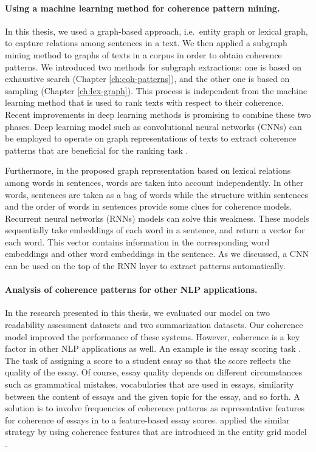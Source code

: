 \paragraph{Using a machine learning method for coherence pattern mining.} 
In this thesis, we used a graph-based approach, i.e.\ entity graph or lexical graph, to capture relations among sentences in a text. 
We then applied a subgraph mining method to graphs of texts in a corpus in order to obtain coherence patterns. 
We introduced two methods for subgraph extractions: one is based on exhaustive search (Chapter \ref{ch:coh-patterns}), and the other one is based on sampling (Chapter \ref{ch:lex-graph}). 
This process is independent from the machine learning method that is used to rank texts with respect to their coherence. 
Recent improvements in deep learning methods is promising to combine these two phases. 
Deep learning model such as convolutional neural networks (CNNs) \cite{} can be employed to operate on graph representations of texts to extract coherence patterns that are beneficial for the ranking task \cite{math}. 

Furthermore, in the proposed graph representation based on lexical relations among words in sentences, words are taken into account independently. 
In other words, sentences are taken as a bag of words while the structure within sentences \cite{louis12} and the order of words in sentences \cite{} provide some clues for coherence models. 
Recurrent neural networks (RNNs) models can solve this weakness. 
These models sequentially take embeddings of each word in a sentence, and return a vector for each word. 
This vector contains information in the corresponding word embeddings and other word embeddings in the sentence. 
As we discussed, a CNN can be used on the top of the RNN layer to extract patterns automatically. 

\paragraph{Analysis of coherence patterns for other NLP applications.}
In the research presented in this thesis, we evaluated our model on two readability assessment datasets and two summarization datasets. 
Our coherence model improved the performance of these systems. 
However, coherence is a key factor in other NLP applications as well. 
An example is the essay scoring task \cite{dikli06,higgins04,miltsakaki04a,}.  
The task of assigning a score to a student essay so that the score reflects the quality of the essay. 
Of course, essay quality depends on different circumstances such as grammatical mistakes, vocabularies that are used in essays, similarity between the content of essays and the given topic for the essay, and so forth. 
A solution is to involve frequencies of coherence patterns as representative features for coherence of essays in to a feature-based essay scores. 
 applied the similar strategy by using coherence features that are introduced in the entity grid model \cite{barzilay05a}. 

